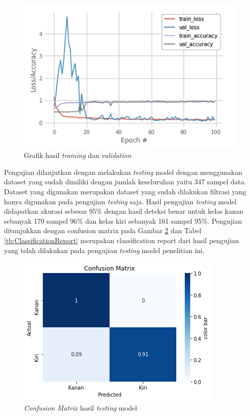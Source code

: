 \begin{figure}[H]
  \centering
  \includegraphics[scale=0.6]{gambar/hasil training dan validation w.jpg}
  \caption{Grafik hasil \emph{training} dan \emph{validation}}
  \label{fig:HasilTrainingValidation}
\end{figure}

Pengujian dilanjutkan dengan melakukan \emph{testing} model dengan menggunakan dataset yang sudah dimiliki dengan jumlah keseluruhan yaitu 347 sampel data. Dataset yang digunakan merupakan dataset yang sudah dilakukan filtrasi yang hanya digunakan pada pengujian \emph{testing} saja. Hasil pengujian \emph{testing} model didapatkan akurasi sebesar 95\% dengan hasil deteksi benar untuk kelas kanan sebanyak 170 sampel 96\% dan kelas kiri sebanyak 161 sampel 95\%. Pengujian ditunjukkan dengan confusion matrix pada Gambar \ref{fig:HasilTesting} dan Tabel \ref{tb:ClassificationReport} merupakan classification report dari hasil pengujian yang telah dilakukan pada pengujian \emph{testing} model penelitian ini.

\begin{figure}[H]
  \centering
  \includegraphics[scale=0.9]{gambar/cm normalized.png}
  \caption{\emph{Confusion Matrix} hasil \emph{testing} model}
  \label{fig:HasilTesting}
\end{figure}

